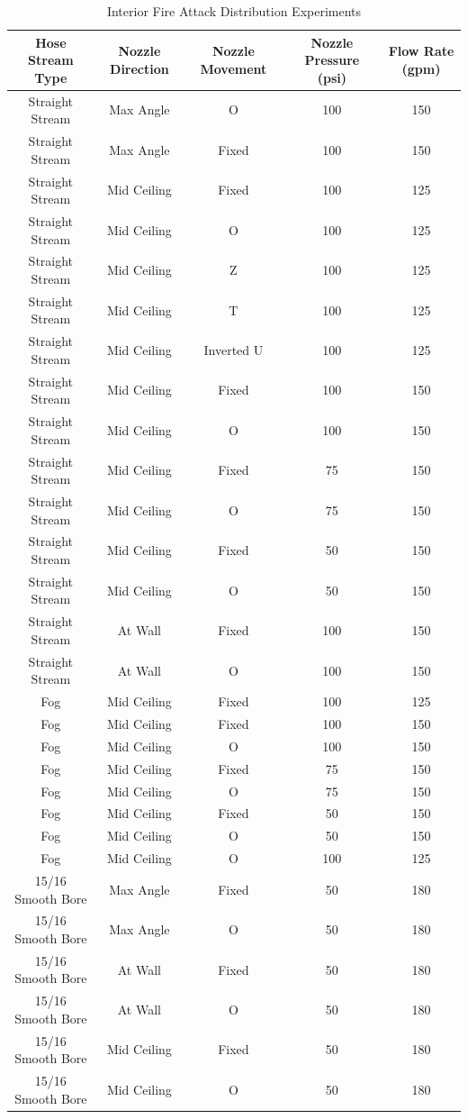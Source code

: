 \documentclass{article}
\begin{document}
\begin{table}[]
\centering
\small
\caption{Interior Fire Attack Distribution Experiments}
\label{tab:Interior_Fire_Attack_Distribution_Experiments}
\begin{tabular}{ccccc}
\toprule[1.5pt]
{{Hose Stream Type}} & {{Nozzle Direction}} & {{Nozzle Movement}} & {{Nozzle Pressure (psi)}} & {Flow Rate (gpm)} \\ 
\midrule
Straight Stream   & Max Angle   & O       & 100 & 150 \\
Straight Stream   & Max Angle   & Fixed   & 100 & 150 \\
Straight Stream   & Mid Ceiling & Fixed   & 100 & 125 \\
Straight Stream   & Mid Ceiling & O       & 100 & 125 \\
Straight Stream   & Mid Ceiling & Z       & 100 & 125 \\
Straight Stream   & Mid Ceiling & T       & 100 & 125 \\
Straight Stream   & Mid Ceiling & Inverted U & 100 & 125 \\
Straight Stream   & Mid Ceiling & Fixed   & 100 & 150 \\
Straight Stream   & Mid Ceiling & O       & 100 & 150 \\
Straight Stream   & Mid Ceiling & Fixed   & 75 & 150 \\
Straight Stream   & Mid Ceiling & O & 75  & 150 \\
Straight Stream   & Mid Ceiling & Fixed   & 50 & 150 \\
Straight Stream   & Mid Ceiling & O & 50  & 150 \\
Straight Stream   & At Wall     & Fixed   & 100 & 150 \\
Straight Stream   & At Wall     & O       & 100 & 150 \\
Fog               & Mid Ceiling & Fixed   & 100 & 125 \\
Fog               & Mid Ceiling & Fixed   & 100 & 150 \\
Fog               & Mid Ceiling & O       & 100 & 150 \\
Fog               & Mid Ceiling & Fixed   & 75 & 150 \\
Fog               & Mid Ceiling & O & 75  & 150 \\
Fog               & Mid Ceiling & Fixed   & 50 & 150 \\
Fog               & Mid Ceiling & O & 50  & 150 \\
Fog               & Mid Ceiling & O       & 100 & 125 \\  
15/16 Smooth Bore & Max Angle   & Fixed   & 50 & 180 \\
15/16 Smooth Bore & Max Angle   & O & 50  & 180 \\
15/16 Smooth Bore & At Wall     & Fixed   & 50 & 180 \\
15/16 Smooth Bore & At Wall     & O & 50  & 180 \\
15/16 Smooth Bore & Mid Ceiling & Fixed   & 50 & 180 \\
15/16 Smooth Bore & Mid Ceiling & O & 50  & 180 \\
\bottomrule[1.25pt]
\end{tabular}
\end{table}
\end{document}
